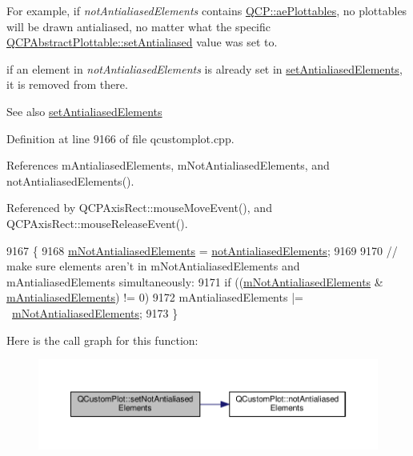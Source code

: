 For example, if {\itshape not\+Antialiased\+Elements} contains \hyperlink{namespace_q_c_p_ae55dbe315d41fe80f29ba88100843a0ca4145e4251b0cf2dbedabeea0a38f84f6}{Q\+C\+P\+::ae\+Plottables}, no plottables will be drawn antialiased, no matter what the specific \hyperlink{class_q_c_p_layerable_a4fd43e89be4a553ead41652565ff0581}{Q\+C\+P\+Abstract\+Plottable\+::set\+Antialiased} value was set to.

if an element in {\itshape not\+Antialiased\+Elements} is already set in \hyperlink{class_q_custom_plot_af6f91e5eab1be85f67c556e98c3745e8}{set\+Antialiased\+Elements}, it is removed from there.

\begin{DoxySeeAlso}{See also}
\hyperlink{class_q_custom_plot_af6f91e5eab1be85f67c556e98c3745e8}{set\+Antialiased\+Elements} 
\end{DoxySeeAlso}


Definition at line 9166 of file qcustomplot.\+cpp.



References m\+Antialiased\+Elements, m\+Not\+Antialiased\+Elements, and not\+Antialiased\+Elements().



Referenced by Q\+C\+P\+Axis\+Rect\+::mouse\+Move\+Event(), and Q\+C\+P\+Axis\+Rect\+::mouse\+Release\+Event().


\begin{DoxyCode}
9167 \{
9168   \hyperlink{class_q_custom_plot_a2b6ebcad00a90ba07f146cefcd4293da}{mNotAntialiasedElements} = \hyperlink{class_q_custom_plot_a8060cee59757213764382a78d3196189}{notAntialiasedElements};
9169   
9170   \textcolor{comment}{// make sure elements aren't in mNotAntialiasedElements and mAntialiasedElements simultaneously:}
9171   \textcolor{keywordflow}{if} ((\hyperlink{class_q_custom_plot_a2b6ebcad00a90ba07f146cefcd4293da}{mNotAntialiasedElements} & \hyperlink{class_q_custom_plot_aa333200629256830e273873b582a5524}{mAntialiasedElements}) != 0)
9172     mAntialiasedElements |= ~\hyperlink{class_q_custom_plot_a2b6ebcad00a90ba07f146cefcd4293da}{mNotAntialiasedElements};
9173 \}
\end{DoxyCode}


Here is the call graph for this function\+:\nopagebreak
\begin{figure}[H]
\begin{center}
\leavevmode
\includegraphics[width=350pt]{class_q_custom_plot_ae10d685b5eabea2999fb8775ca173c24_cgraph}
\end{center}
\end{figure}




